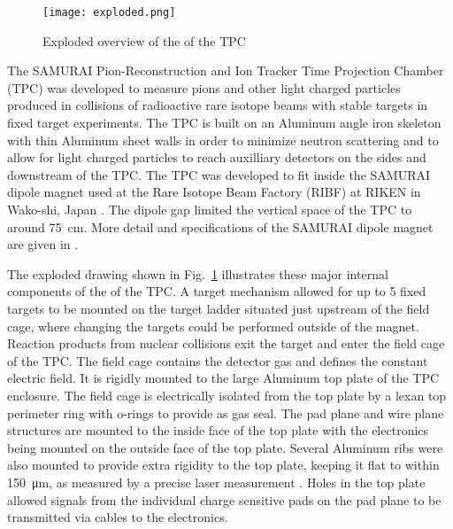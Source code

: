 \begin{figure}[!htb]
\texttt{[image: exploded.png]}
\caption{Exploded overview of the of the \spirit TPC}
\label{fig:tpcExplode}
\end{figure}


The SAMURAI Pion-Reconstruction and Ion Tracker Time Projection Chamber (\spirit TPC) was developed to measure pions and other light charged particles produced in collisions of radioactive rare isotope beams with stable targets in fixed target experiments.  The TPC is built on an Aluminum angle iron skeleton with thin Aluminum sheet walls in order to minimize neutron scattering and to allow for light charged particles to reach auxilliary detectors on the sides and downstream of the TPC. The \spirit TPC was developed to fit inside the SAMURAI dipole magnet used at the Rare Isotope Beam Factory (RIBF) at RIKEN in Wako-shi, Japan \cite{riken}. The dipole gap limited the vertical space of the TPC to around \SI{75}{\centi\metre}. More detail and specifications of the SAMURAI dipole magnet are given in \cite{samurai}. 

The exploded drawing shown in Fig.~\ref{fig:tpcExplode} illustrates these major internal components of the  of the \spirit TPC. A target mechanism allowed for up to 5 fixed targets to be mounted on the target ladder situated just upstream of the field cage, where changing the targets could be performed outside of the magnet. Reaction products from nuclear collisions exit the target and enter the field cage of the TPC. The field cage contains the detector gas and defines the constant electric field. It is rigidly mounted to the large Aluminum top plate of the TPC enclosure. The field cage is electrically isolated from the top plate by a lexan top perimeter ring with o-rings to provide as gas seal. The pad plane and wire plane structures are  mounted to the inside face of the top plate with the electronics being mounted on the outside face of the top plate. Several Aluminum ribs were also mounted to provide extra rigidity to the top plate, keeping it flat to within \SI{150}{\micro\metre}, as measured by a precise laser measurement \cite{jon}. Holes in the top plate allowed signals from the individual charge sensitive pads on the pad plane to be transmitted via cables to the electronics. 



